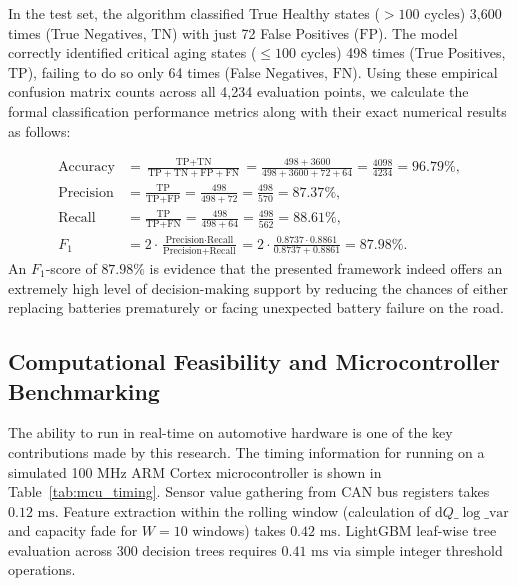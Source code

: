 \documentclass[pdflatex,sn-mathphys-num]{sn-jnl}%
\theoremstyle{thmstyleone}%
\theoremstyle{thmstyletwo}%
\theoremstyle{thmstylethree}%
\begin{document}
In the test set, the algorithm classified True Healthy states ($>100\text{ cycles}$) 3,600 times (True Negatives, $\text{TN}$) with just 72 False Positives ($\text{FP}$). The model correctly identified critical aging states ($\le 100\text{ cycles}$) 498 times (True Positives, $\text{TP}$), failing to do so only 64 times (False Negatives, $\text{FN}$). Using these empirical confusion matrix counts across all 4,234 evaluation points, we calculate the formal classification performance metrics along with their exact numerical results as follows:

\begin{align}
\text{Accuracy} &= \frac{\text{TP} + \text{TN}}{\text{TP} + \text{TN} + \text{FP} + \text{FN}} = \frac{498 + 3600}{498 + 3600 + 72 + 64} = \frac{4098}{4234} = 96.79\%, \label{eq:accuracy} \\[1ex]
\text{Precision} &= \frac{\text{TP}}{\text{TP} + \text{FP}} = \frac{498}{498 + 72} = \frac{498}{570} = 87.37\%, \label{eq:precision} \\[1ex]
\text{Recall} &= \frac{\text{TP}}{\text{TP} + \text{FN}} = \frac{498}{498 + 64} = \frac{498}{562} = 88.61\%, \label{eq:recall} \\[1ex]
F_1 &= 2 \cdot \frac{\text{Precision} \cdot \text{Recall}}{\text{Precision} + \text{Recall}} = 2 \cdot \frac{0.8737 \cdot 0.8861}{0.8737 + 0.8861} = 87.98\%. \label{eq:f1_score}
\end{align}
An $F_1$-score of $87.98\%$ is evidence that the presented framework indeed offers an extremely high level of decision-making support by reducing the chances of either replacing batteries prematurely or facing unexpected battery failure on the road.

\subsection{Computational Feasibility and Microcontroller Benchmarking}\label{subsec:mcu_benchmarking}

The ability to run in real-time on automotive hardware is one of the key contributions made by this research. The timing information for running on a simulated 100 MHz ARM Cortex microcontroller is shown in Table~\ref{tab:mcu_timing}. Sensor value gathering from CAN bus registers takes $0.12\text{ ms}$. Feature extraction within the rolling window (calculation of $\text{d}Q\_\log\_\text{var}$ and capacity fade for $W=10$ windows) takes $0.42\text{ ms}$. LightGBM leaf-wise tree evaluation across 300 decision trees requires $0.41\text{ ms}$ via simple integer threshold operations.
\end{document}
